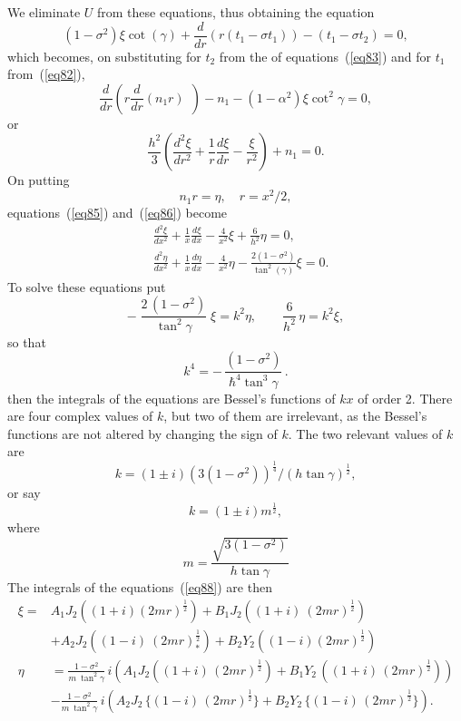 We eliminate \(U\) from these equations, thus obtaining the equation
\[
\left(1-\sigma^2\right) \xi \cot(\gamma) +
\frac{d}{d r}\left( r\left(t_1-\sigma t_1\right) \right)
-\left(t_1-\sigma t_2\right)=0,\]
which becomes, on substituting for \(t_2\) from the  of
equations~(\ref{eq83}) and for \(t_1\) from~(\ref{eq82}),
\[
\frac{d}{d r}\left( r \frac{d}{d r} (n_1 r) ~~ \right)-
n_1-\left(1-\alpha^2\right) \xi \cot ^2 \gamma=0,
\]
or
\begin{equation}\label{eq86}
\frac{h^2}{3}\left(\frac{d^2 \xi}{d r^2}+
\frac{1}{r} \frac{d \xi}{d r}-\frac{\xi}{r^2}\right)+n_1=0.
\end{equation}
On putting
\begin{equation}\label{eq87}
n_1 r = \eta, \quad r = x^2/2,
\end{equation}
equations~(\ref{eq85}) and~(\ref{eq86}) become
\begin{align}
& \frac{d^2 \xi}{d x^2}+\frac{1}{x} \frac{d \xi}{d x}-\frac{4}{x^2} \xi+\frac{6}{h^2} \eta=0, \nonumber \\
& \frac{d^2 \eta}{d x^2}+\frac{1}{x} \frac{d \eta}{d x}-\frac{4}{x^2} \eta-\frac{2\left(1-\sigma^2\right)}{\tan^2(\gamma)} \xi=0 \label{eq88}.
\end{align}
To solve these equations put
\[
-\;\frac{2\,(1-\sigma^{2})}{\tan^{2}\gamma}\; \xi=k^{2}\eta, \qquad
\frac{6}{h^{2}}\,\eta=k^{2}\xi,
\]
so that
\begin{equation}\label{eq89}
k^{4}=-\,{\frac{(1-\sigma^{2})}{\hbar^{4}\tan^{3}\gamma}}\,.
\end{equation}
then the integrals of the equations are Bessel's functions of
\(k x\)
of order 2.
There are four complex values of
\(k\), but two of them are irrelevant, as the Bessel's functions are not altered by changing the sign of
\(k\).
The two relevant values of
\(k\)
are
\[
k= (1\pm i){(3(1-\sigma^{2}))}^{\frac{1}{4}}/{(h\tan \gamma )}^{\frac{1}{2}},
\]
or say
\[
k=\left(1\pm i\right)m^{\frac{1}{2}},
\]
where
\begin{equation}
m= \frac{\sqrt{ 3\left(1-\sigma^{2}\right)}}{h\tan\gamma}
\end{equation}
\[
\]
The integrals of the equations~(\ref{eq88}) are then
\begin{align}
\xi=&A_{1}J_{2}\left((1+i){(2mr)}^{\frac{1}{2}}\right)+
B_{1}J_{2}\left((1+i)\ {(2 mr)}^{\frac{1}{2}}\right) \nonumber \\
&+A_{2}J_{2}\left((1-i)\ {(2mr)}_{*}^{\frac{1}{2}}\right)+
B_{2}Y_{2}\left((1-i){(2mr)}^{\frac{1}{2}}\right) \nonumber \\
\eta&=\frac{1-\sigma^{2}}{m~\tan^{2}\gamma}\,i
\left( A_{1}J_{2}\left((1+i)\,{(2mr)}^{\frac{1}{2}}\right)+
B_{1}Y_{2}\,\left((1+i)\,{(2mr)}^{\frac{1}{2}}\right)\right) \label{eq91}\\
&-\frac{1-\sigma^{2}}{m~\tan^{2}\gamma}\,i
\left( A_{2}J_{2}\, \{(1-i)\,{(2mr)}^{\frac{1}{2}}\}
+B_{2}Y_{2}\, \{(1-i)\,{(2mr)}^{\frac{1}{2}}\} \right) \nonumber .
\end{align}

